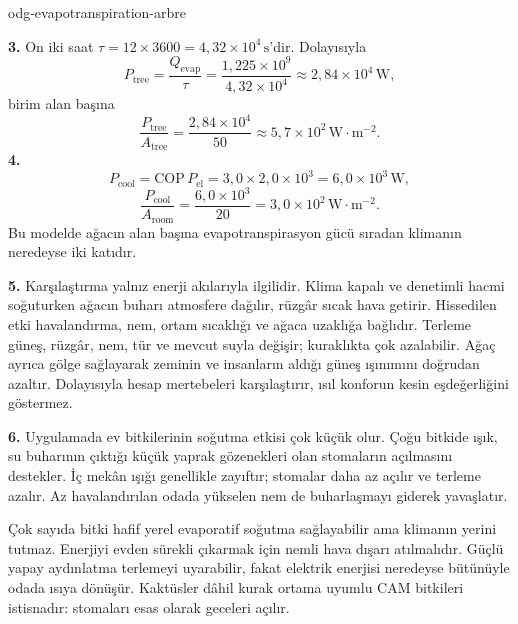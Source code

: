 \begin{exo}{odg-evapotranspiration-arbre}
\begin{solution}
\textbf{3.} On iki saat $\tau=12\times3600=4{,}32\times10^4\,\text{s}$'dir. Dolayısıyla
\[
P_{\text{tree}}=\frac{Q_{\mathrm{evap}}}{\tau}
=\frac{1{,}225\times10^9}{4{,}32\times10^4}\approx2{,}84\times10^4\,\text{W},
\]
birim alan başına
\[
\frac{P_{\text{tree}}}{A_{\text{tree}}}
=\frac{2{,}84\times10^4}{50}\approx5{,}7\times10^2\,\text{W}\!\cdot\!\text{m}^{-2}.
\]
\textbf{4.}
\[
P_{\text{cool}}=\mathrm{COP}\,P_{\mathrm{el}}
=3{,}0\times2{,}0\times10^3=6{,}0\times10^3\,\text{W},
\]
\[
\frac{P_{\text{cool}}}{A_{\text{room}}}
=\frac{6{,}0\times10^3}{20}=3{,}0\times10^2\,\text{W}\!\cdot\!\text{m}^{-2}.
\]
Bu modelde ağacın alan başına evapotranspirasyon gücü sıradan klimanın neredeyse iki katıdır.

\textbf{5.} Karşılaştırma yalnız enerji akılarıyla ilgilidir. Klima kapalı ve denetimli hacmi soğuturken ağacın buharı atmosfere dağılır, rüzgâr sıcak hava getirir. Hissedilen etki havalandırma, nem, ortam sıcaklığı ve ağaca uzaklığa bağlıdır. Terleme güneş, rüzgâr, nem, tür ve mevcut suyla değişir; kuraklıkta çok azalabilir. Ağaç ayrıca gölge sağlayarak zeminin ve insanların aldığı güneş ışınımını doğrudan azaltır. Dolayısıyla hesap mertebeleri karşılaştırır, ısıl konforun kesin eşdeğerliğini göstermez.

\textbf{6.} Uygulamada ev bitkilerinin soğutma etkisi çok küçük olur. Çoğu bitkide ışık, su buharının çıktığı küçük yaprak gözenekleri olan stomaların açılmasını destekler. İç mekân ışığı genellikle zayıftır; stomalar daha az açılır ve terleme azalır. Az havalandırılan odada yükselen nem de buharlaşmayı giderek yavaşlatır.

Çok sayıda bitki hafif yerel evaporatif soğutma sağlayabilir ama klimanın yerini tutmaz. Enerjiyi evden sürekli çıkarmak için nemli hava dışarı atılmalıdır. Güçlü yapay aydınlatma terlemeyi uyarabilir, fakat elektrik enerjisi neredeyse bütünüyle odada ısıya dönüşür. Kaktüsler dâhil kurak ortama uyumlu CAM bitkileri istisnadır: stomaları esas olarak geceleri açılır.
\end{solution}
\end{exo}

